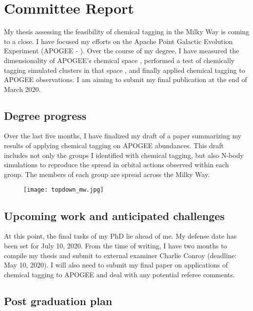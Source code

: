 \documentclass[11pt]{article}
\begin{document}
    
    \section*{Committee Report}


	My thesis assessing the feasibility of chemical tagging in the Milky Way is coming to a close. I have focused my efforts on the Apache Point Galactic Evolution Experiment (APOGEE - \citealt{Majewski2017}). Over the course of my degree, I have measured the dimensionality of APOGEE's chemical space \citep{Price-Jones2018}, performed a test of chemically tagging simulated clusters in that space \citep{Price-Jones2019}, and finally applied chemical tagging to APOGEE observations. I am aiming to submit my final publication at the end of March 2020.

    \subsection*{Degree progress}
    
    Over the last five months, I have finalized my draft of a paper summarizing my results of applying chemical tagging on APOGEE abundances. This draft includes not only the groups I identified with chemical tagging, but also N-body simulations to reproduce the spread in orbital actions observed within each group. The members of each group are spread across the Milky Way.
    
\begin{figure}[h]
\centering
\texttt{[image: topdown\_mw.jpg]}
\caption{}
\label{fig:mw}
\end{figure}

	
    
    \subsection*{Upcoming work and anticipated challenges}
    
    At this point, the final tasks of my PhD lie ahead of me. My defense date has been set for July 10, 2020. From the time of writing, I have two months to compile my thesis and submit to external examiner Charlie Conroy (deadline: May 10, 2020). I will also need to submit my final paper on applications of chemical tagging to APOGEE and deal with any potential referee comments.

	\subsection*{Post graduation plan}
	
\end{document}
